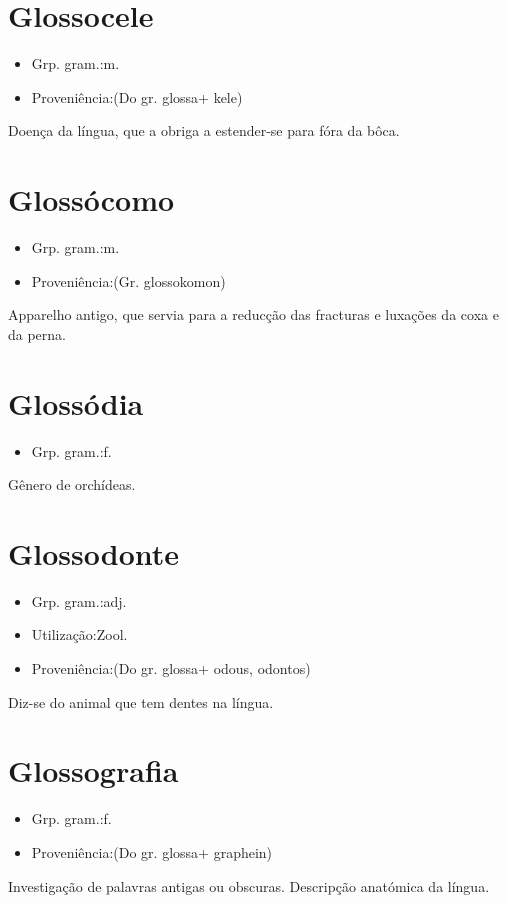 \section{Glossocele}
\begin{itemize}
\item {Grp. gram.:m.}
\end{itemize}
\begin{itemize}
\item {Proveniência:(Do gr. \textunderscore glossa\textunderscore  + \textunderscore kele\textunderscore )}
\end{itemize}
Doença da língua, que a obriga a estender-se para fóra da bôca.
\section{Glossócomo}
\begin{itemize}
\item {Grp. gram.:m.}
\end{itemize}
\begin{itemize}
\item {Proveniência:(Gr. \textunderscore glossokomon\textunderscore )}
\end{itemize}
Apparelho antigo, que servia para a reducção das fracturas e luxações da coxa e da perna.
\section{Glossódia}
\begin{itemize}
\item {Grp. gram.:f.}
\end{itemize}
Gênero de orchídeas.
\section{Glossodonte}
\begin{itemize}
\item {Grp. gram.:adj.}
\end{itemize}
\begin{itemize}
\item {Utilização:Zool.}
\end{itemize}
\begin{itemize}
\item {Proveniência:(Do gr. \textunderscore glossa\textunderscore  + \textunderscore odous\textunderscore , \textunderscore odontos\textunderscore )}
\end{itemize}
Diz-se do animal que tem dentes na língua.
\section{Glossografia}
\begin{itemize}
\item {Grp. gram.:f.}
\end{itemize}
\begin{itemize}
\item {Proveniência:(Do gr. \textunderscore glossa\textunderscore  + \textunderscore graphein\textunderscore )}
\end{itemize}
Investigação de palavras antigas ou obscuras.
Descripção anatómica da língua.
